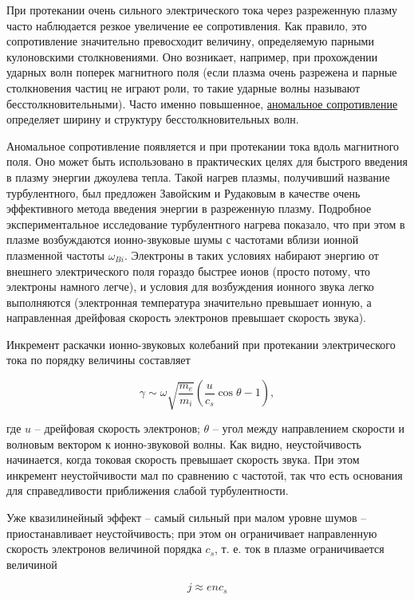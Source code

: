 \documentclass[10pt, a4paper]{article}
\begin{document}
При протекании очень сильного электрического тока через разреженную плазму часто наблюдается резкое увеличение ее сопротивления. Как правило, это сопротивление значительно превосходит величину, определяемую парными кулоновскими столкновениями. Оно возникает, например, при прохождении ударных волн поперек магнитного поля (если плазма очень разрежена и парные столкновения частиц не играют роли, то такие ударные волны называют бесстолкновительными). Часто именно повышенное, \uline{аномальное сопротивление} определяет ширину и структуру бесстолкновительных волн.

Аномальное сопротивление появляется и при протекании тока вдоль магнитного поля. Оно может быть использовано в практических целях для быстрого введения в плазму энергии джоулева тепла. Такой нагрев плазмы, получивший название турбулентного, был предложен Завойским и Рудаковым в качестве очень эффективного метода введения энергии в разреженную плазму. Подробное экспериментальное исследование турбулентного нагрева показало, что при этом в плазме возбуждаются ионно-звуковые шумы с частотами вблизи ионной плазменной частоты $\omega_{Bi}$. Электроны в таких условиях набирают энергию от внешнего электрического поля гораздо быстрее ионов (просто потому, что электроны намного легче), и условия для возбуждения ионного звука легко выполняются (электронная температура значительно превышает ионную, а направленная дрейфовая скорость электронов превышает скорость звука).

Инкремент раскачки ионно-звуковых колебаний при протекании электрического тока по порядку величины составляет 

\begin{equation*}
	\gamma \sim \omega \sqrt{\frac{m_e}{m_i}}\left(
	\frac{u}{c_s}\cos\theta-1\right),
\end{equation*}

где $u$ -- дрейфовая скорость электронов; $\theta$ -- угол между направлением скорости и волновым вектором к ионно-звуковой волны. Как видно, неустойчивость начинается, когда токовая скорость превышает скорость звука. При этом инкремент неустойчивости мал по сравнению с частотой, так что есть основания для справедливости приближения слабой турбулентности.

Уже квазилинейный эффект -- самый сильный при малом уровне шумов -- приостанавливает неустойчивость; при этом он ограничивает направленную скорость электронов величиной порядка $c_s$, т. е. ток в плазме ограничивается величиной 

\begin{equation*}
	j\approx e nc_s
\end{equation*}
\end{document}
